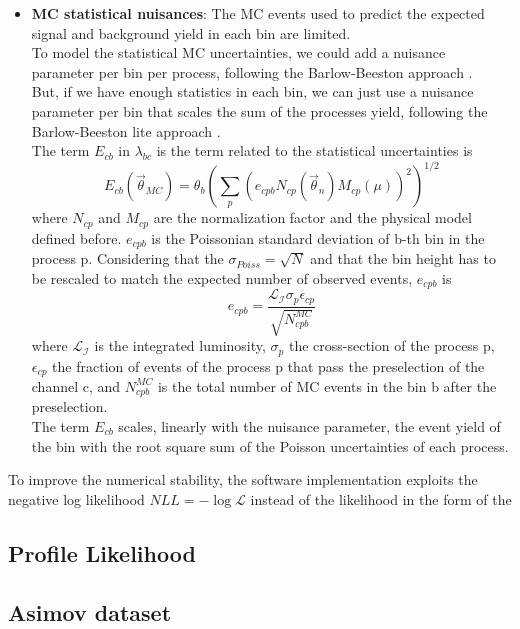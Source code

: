 \begin{itemize}
    
    \item \textbf{MC statistical nuisances}: The MC events used to predict the expected signal and background yield in each bin are limited.\\
    To model the statistical MC uncertainties, we could add a nuisance parameter per bin per process, following the Barlow-Beeston approach \ADDREF.\\
    But, if we have enough statistics in each bin, we can just use a nuisance parameter per bin that scales the sum of the processes yield, following the Barlow-Beeston lite approach \ADDREF.\\
    The term $E_{cb}$ in $\lambda_{bc}$ is the term related to the statistical uncertainties is
    \begin{equation}
        E_{cb}(\vec{\theta}_{MC})=\theta_b\left(\sum_p \left(e_{cpb}N_{cp}(\vec{\theta}_n)M_{cp}(\mu)\right)^2 \right)^{1/2}
    \end{equation}
    where $N_{cp}$ and $M_{cp}$ are the normalization factor and the physical model defined before.
    $e_{cpb}$ is the Poissonian standard deviation of b-th bin in the process p. Considering that the $\sigma_{Poiss}=\sqrt{N}$ and that the bin height has to be rescaled to match the expected number of observed events, $e_{cpb}$ is
    \begin{equation}
        e_{cpb}=\frac{\mathcal{L_I} \sigma_p \epsilon_{cp}}{\sqrt{N^{MC}_{cpb}}}
    \end{equation}
    where $\mathcal{L_I}$ is the integrated luminosity, $\sigma_p$ the cross-section of the process p, $\epsilon_{cp}$ the fraction of events of the process p that pass the preselection of the channel c, and $N_{cpb}^{MC}$ is the total number of MC events in the bin b after the preselection.\\
    The term $E_{cb}$ scales, linearly with the nuisance parameter, the event yield of the bin with the root square sum of the Poisson uncertainties of each process.\\
    

\end{itemize}
To improve the numerical stability, the software implementation exploits the negative log likelihood $\textit{NLL}=-\log{\mathcal{L}}$ instead of the likelihood in the form of the   

 
\subsection{Profile Likelihood}

\subsection{Asimov dataset}

